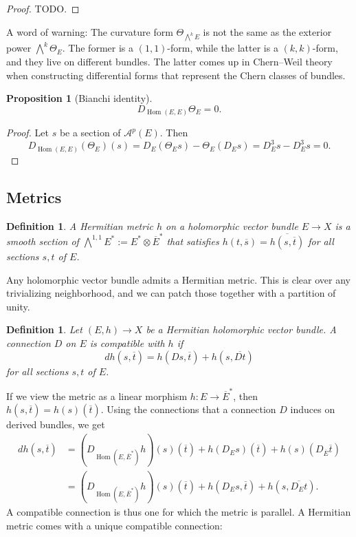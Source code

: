\documentclass[10pt,a4paper]{article}
\newtheorem{prop}[theo]{Proposition}
\newtheorem{defi}[theo]{Definition}
\newtheorem*{proof}{Proof}
\newcommand{\cc}[1]{\mathcal{#1}}
\def\ov#1{\overline{#1}}
\DeclareMathOperator{\Hom}{Hom}
\begin{document}
\begin{proof}
  TODO.
\end{proof}


A word of warning: The curvature form $\Theta_{\bigwedge^kE}$ is not the same as the exterior power $\bigwedge^k \Theta_E$. The former is a $(1,1)$-form, while the latter is a $(k,k)$-form, and they live on different bundles. The latter comes up in Chern--Weil theory when constructing differential forms that represent the Chern classes of bundles.


\begin{prop}[Bianchi identity]
\label{prop:bianchi-general}
\[
D_{\Hom(E,E)} \Theta_E = 0.
\]
\end{prop}

\begin{proof}
Let $s$ be a section of $\cc A^p(E)$. Then
\[
D_{\Hom(E,E)}(\Theta_E)(s)
= D_E(\Theta_E s) - \Theta_E(D_E s)
= D_E^3 s - D_E^3 s = 0.
\]
\end{proof}


\subsection{Metrics}

\begin{defi}
A \emph{Hermitian metric} $h$ on a holomorphic vector bundle $E \to X$ is a smooth section of $\bigwedge^{1,1}E^* := E^* \otimes \overline E^*$ that satisfies $h(t,\ov s) = \overline{h(s,\ov t)}$ for all sections $s, t$ of $E$.
\end{defi}

Any holomorphic vector bundle admits a Hermitian metric. This is clear over any trivializing neighborhood, and we can patch those together with a partition of unity.


\begin{defi}
Let $(E, h) \to X$ be a Hermitian holomorphic vector bundle. A connection $D$ on $E$ is \emph{compatible} with $h$ if
$$
d h(s, \ov t)
= h(Ds, \ov t) + h(s,\ov{Dt})
$$
for all sections $s, t$ of $E$.
\end{defi}

If we view the metric as a linear morphism $h : E \to \ov E^*$, then $h(s, \ov t) = h(s)(\ov t)$. Using the connections that a connection $D$ induces on derived bundles, we get
\begin{align*}
d h(s, \ov t)
&= (D_{\Hom(E, \ov E^*)}h)(s)(\ov t)
+ h(D_E s)(\ov t)
+ h(s)(D_{\ov E}\ov{t})
\\
&= (D_{\Hom(E, \ov E^*)}h)(s)(\ov t)
+ h(D_E s, \ov t)
+ h(s, \ov{D_E t}).
\end{align*}
A compatible connection is thus one for which the metric is parallel.
A Hermitian metric comes with a unique compatible connection:
\end{document}
